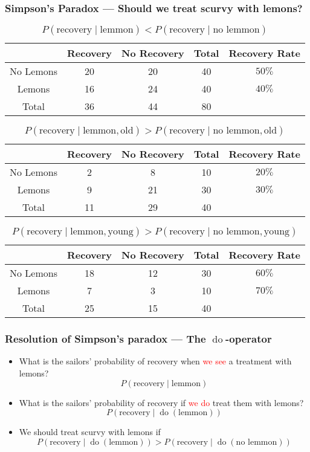 \documentclass[UTF8,11pt,colorlinks,compress,openany]{beamer}%
\begin{document}
\begin{frame}\frametitle{Simpson's Paradox --- Should we treat scurvy with lemons?}
\vspace*{-1ex}
\begin{table}
\begin{tabu}{c|cccc}
\hline
 & Recovery & No Recovery & Total & Recovery Rate\\
\hline
No Lemons & 20 & 20 & 40 & $50\%$ \\
Lemons & 16 & 24 & 40 & $40\%$ \\
Total & 36 & 44 & 80 &\\
\hline
\end{tabu}\caption{$P(\text{recovery}\mid\text{lemmon})<P(\text{recovery}\mid\text{no lemmon})$}
\end{table}
\begin{table}
\vspace*{-1ex}
\begin{tabu}{c|cccc}
\hline
 & Recovery & No Recovery & Total & Recovery Rate\\
\hline
No Lemons & 2 & 8 & 10 & $20\%$ \\
Lemons & 9 & 21 & 30 & $30\%$ \\
Total & 11 & 29 & 40 &\\
\hline
\end{tabu}\caption{$P(\text{recovery}\mid\text{lemmon},\text{old})>P(\text{recovery}\mid\text{no lemmon},\text{old})$}
\end{table}
\vspace*{-1ex}
\begin{table}
\begin{tabu}{c|cccc}
\hline
 & Recovery & No Recovery & Total & Recovery Rate\\
\hline
No Lemons & 18 & 12 & 30 & $60\%$ \\
Lemons & 7 & 3 & 10 & $70\%$ \\
Total & 25 & 15 & 40 &\\
\hline
\end{tabu}\caption{$P(\text{recovery}\mid\text{lemmon},\text{young})>P(\text{recovery}\mid\text{no lemmon},\text{young})$}
\end{table}
\end{frame}

\begin{frame}\frametitle{Resolution of Simpson's paradox --- The $\operatorname{do}$-operator}
\begin{itemize}
	\item What is the sailors' probability of recovery when \textcolor{red}{we see} a treatment with lemons?
	\[P(\text{recovery}\mid\text{lemmon})\]
	\item What is the sailors' probability of recovery if \textcolor{red}{we do} treat them with lemons?
	\[P(\text{recovery}\mid\operatorname{do}(\text{lemmon}))\]
	\item We should treat scurvy with lemons if
	\[P(\text{recovery}\mid\operatorname{do}(\text{lemmon}))>P(\text{recovery}\mid\operatorname{do}(\text{no lemmon}))\]
\end{itemize}
\end{frame}
\end{document}
